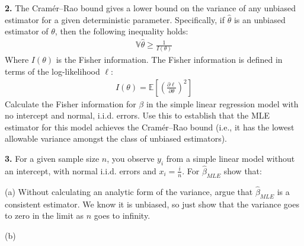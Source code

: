 \documentclass[12pt]{article}
\begin{document}
\bigskip

{\bf 2.} The Cramér–Rao bound gives a lower bound on the variance of any unbiased estimator
for a given deterministic parameter. Specifically, if $\widehat{\theta}$ is an unbiased
estimator of $\theta$, then the following inequality holds:
\begin{align}
\mathbb{V} \widehat{\theta} \geq \frac{1}{I(\theta)}
\end{align}
Where $I(\theta)$ is the Fisher information. The Fisher information is defined in terms
of the log-likelihood $\ell$:
\begin{align}
I(\theta) = \mathbb{E} \left[ \left( \frac{\partial \ell}{\partial \theta} \right)^2 \right]
\end{align}
Calculate the Fisher information for $\beta$ in the simple linear regression model with
no intercept and normal, i.i.d. errors. Use this to establish that the MLE estimator for
this model achieves the Cramér–Rao bound (i.e., it has the lowest allowable variance
amongst the class of unbiased estimators).

{\bf 3.} For a given sample size $n$, you observe $y_i$ from a simple linear model without an
intercept, with normal i.i.d. errors and $x_i = \frac{i}{n}$. For $\widehat{\beta}_{MLE}$ show
that:

(a) Without calculating an analytic form of the variance, argue that $\widehat{\beta}_{MLE}$
is a consistent estimator. We know it is unbiased, so just show that the variance
goes to zero in the limit as $n$ goes to infinity.

(b)
\end{document}
